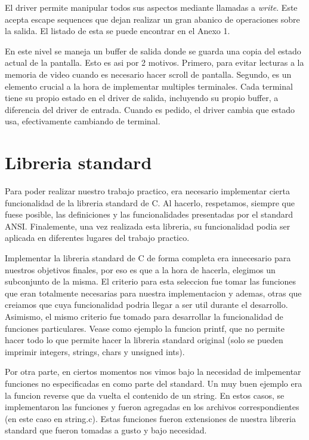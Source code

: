 \documentclass[a4paper,10pt]{article}
\begin{document}
            El driver permite manipular todos sus aspectos mediante llamadas a \textit{write}.
            Este acepta escape sequences que dejan realizar un gran abanico de operaciones sobre la salida.
            El listado de esta se puede encontrar en el Anexo 1.
            
            En este nivel se maneja un buffer de salida donde se guarda una copia del estado actual de la pantalla.
            Esto es asi por 2 motivos.
            Primero, para evitar lecturas a la memoria de video cuando es necesario hacer scroll de pantalla.
            Segundo, es un elemento crucial a la hora de implementar multiples terminales.
            Cada terminal tiene su propio estado en el driver de salida, incluyendo su propio buffer, a diferencia del driver de entrada.
            Cuando es pedido, el driver cambia que estado usa, efectivamente cambiando de terminal.

\section{Libreria standard}
    Para poder realizar nuestro trabajo practico, era necesario implementar cierta funcionalidad de la libreria standard de C. Al hacerlo, respetamos, siempre que fuese posible, las definiciones y las funcionalidades presentadas por el standard ANSI.
    Finalemente, una vez realizada esta libreria, su funcionalidad podia ser aplicada en diferentes lugares del trabajo practico.

    Implementar la libreria standard de C de forma completa era innecesario para nuestros objetivos finales, por eso es que a la hora de hacerla, elegimos un subconjunto de la misma. El criterio para esta seleccion fue tomar las funciones que eran totalmente necesarias para nuestra implementacion y ademas, otras que creiamos que cuya funcionalidad podria llegar a ser util durante el desarrollo.
    Asimismo, el mismo criterio fue tomado para desarrollar la funcionalidad de funciones particulares. Vease como ejemplo la funcion printf, que no permite hacer todo lo que permite hacer la libreria standard original (solo se pueden imprimir integers, strings, chars y unsigned ints).

    Por otra parte, en ciertos momentos nos vimos bajo la necesidad de imlpementar funciones no especificadas en como parte del standard. Un muy buen ejemplo era la funcion reverse que da vuelta el contenido de un string. En estos casos, se implementaron las funciones y fueron agregadas en los archivos correspondientes (en este caso en string.c). Estas funciones fueron extensiones de nuestra libreria standard que fueron tomadas a gusto y bajo necesidad.
\end{document}
